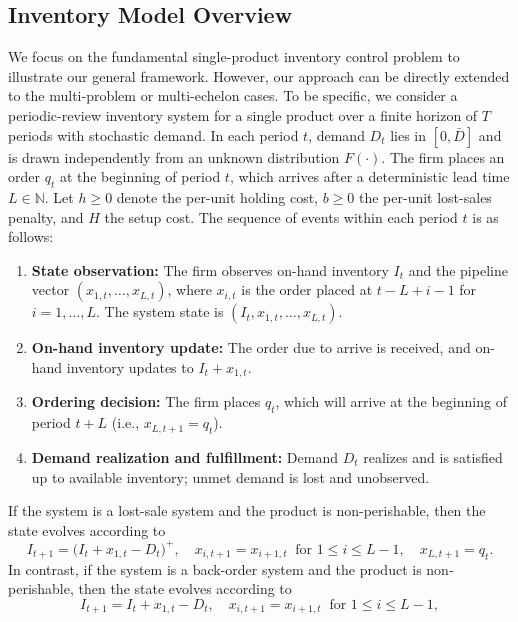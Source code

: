 \documentclass[mnsc,nonblindrev]{informs3_hide}
\begin{document}
\begin{APPENDICES}

\section{Inventory Model Overview}\label{sec:InventoryModel}

We focus on the fundamental single-product inventory control problem to illustrate our general framework. However, our approach can be directly extended to the multi-problem or multi-echelon cases. To be specific, we 
consider a periodic-review inventory system for a single product over a finite horizon of $T$ periods with stochastic demand. In each period $t$, demand $D_t$ lies in $[0, \bar{D}]$ and is drawn independently from an unknown distribution $F(\cdot)$. The firm places an order $q_t$ at the beginning of period $t$, which arrives after a deterministic lead time $L \in \mathds{N}$. Let $h \ge 0$ denote the per-unit holding cost, $b \ge 0$ the per-unit lost-sales penalty, and $H$ the setup cost.
The sequence of events within each period $t$ is as follows:
\begin{enumerate}
    \item \textbf{State observation:} The firm observes on-hand inventory $I_t$ and the pipeline vector $(x_{1,t}, \ldots, x_{L,t})$, where $x_{i,t}$ is the order placed at $t-L+i-1$ for $i = 1, \ldots, L$. The system state is $(I_t, x_{1,t}, \ldots, x_{L,t})$.
    \item \textbf{On-hand inventory update:} The order due to arrive is received, and on-hand inventory updates to $I_t + x_{1,t}$.
    \item \textbf{Ordering decision:} The firm places $q_t$, which will arrive at the beginning of period $t+L$ (i.e., \mbox{$x_{L,t+1} = q_t$}).
    \item \textbf{Demand realization and fulfillment:} Demand $D_t$ realizes and is satisfied up to available inventory; unmet demand is lost and unobserved.
\end{enumerate}
If the system is a lost-sale system and the product is non-perishable, then
the state evolves according to
\[
I_{t+1} = \big(I_t + x_{1,t} - D_t\big)^+, 
\quad x_{i,t+1} = x_{i+1,t} \ \text{ for } 1 \le i \le L-1, 
\quad x_{L,t+1} = q_t.
\]
In contrast, if the system is a back-order system and the product is non-perishable, then the state evolves according to 
\[
I_{t+1} = I_t + x_{1,t} - D_t, 
\quad x_{i,t+1} = x_{i+1,t} \ \text{ for } 1 \le i \le L-1, 
\]
\end{APPENDICES}
\end{document}
